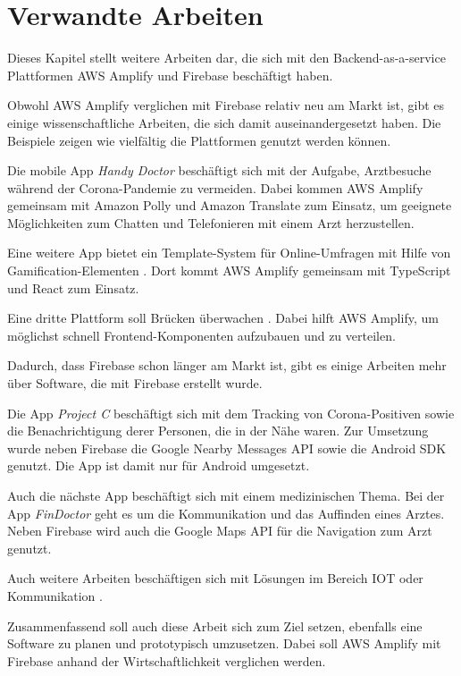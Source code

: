 \chapter{Verwandte Arbeiten}

Dieses Kapitel stellt weitere Arbeiten dar, die sich mit den Backend-as-a-service Plattformen \ac{AWS} Amplify und Firebase beschäftigt haben.

Obwohl \ac{AWS} Amplify verglichen mit Firebase relativ neu am Markt ist, gibt es einige wissenschaftliche Arbeiten, die sich damit auseinandergesetzt haben. Die Beispiele zeigen wie vielfältig die Plattformen genutzt werden können.

Die mobile App \textit{Handy Doctor} \autocite{st2021handy} beschäftigt sich mit der Aufgabe, Arztbesuche während der Corona-Pandemie zu vermeiden. Dabei kommen \ac{AWS} Amplify gemeinsam mit Amazon Polly und Amazon Translate zum Einsatz, um geeignete Möglichkeiten zum Chatten und Telefonieren mit einem Arzt herzustellen.

Eine weitere App bietet ein Template-System für Online-Umfragen mit Hilfe von Gamification-Elementen \autocite{kuwamura2021application}. Dort kommt AWS Amplify gemeinsam mit TypeScript und React zum Einsatz.

Eine dritte Plattform soll Brücken überwachen \autocite{naraharisetty2021cloud}. Dabei hilft \ac{AWS} Amplify, um möglichst schnell Frontend-Komponenten aufzubauen und zu verteilen.

Dadurch, dass Firebase schon länger am Markt ist, gibt es einige Arbeiten mehr über Software, die mit Firebase erstellt wurde.

Die App \textit{Project C} \autocite{rahman2021project} beschäftigt sich mit dem Tracking von Corona-Positiven sowie die Benachrichtigung derer Personen, die in der Nähe waren. Zur Umsetzung wurde neben Firebase die Google Nearby Messages API sowie die Android SDK genutzt. Die App ist damit nur für Android umgesetzt.

Auch die nächste App beschäftigt sich mit einem medizinischen Thema. Bei der App \textit{FinDoctor} \autocite{rahmi2017findoctor} geht es um die Kommunikation und das Auffinden eines Arztes. Neben Firebase wird auch die Google Maps API für die Navigation zum Arzt genutzt.

Auch weitere Arbeiten beschäftigen sich mit Lösungen im Bereich IOT oder Kommunikation \autocite{li2018justiot} \autocite{sharma2019firebase} \autocite{bhadoria2020chatapp} \autocite{khawas2018application}.

Zusammenfassend soll auch diese Arbeit sich zum Ziel setzen, ebenfalls eine Software zu planen und prototypisch umzusetzen. Dabei soll \ac{AWS} Amplify mit Firebase anhand der Wirtschaftlichkeit verglichen werden.